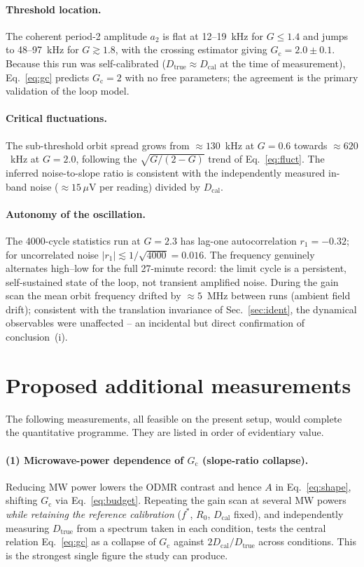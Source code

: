 \documentclass[11pt,a4paper]{article}
\newcommand{\Gc}{G_{\mathrm{c}}}
\newcommand{\Dcal}{D_{\mathrm{cal}}}
\newcommand{\Dtrue}{D_{\mathrm{true}}}
\begin{document}
\paragraph{Threshold location.} The coherent period-2 amplitude $a_2$ is flat
at 12--19~kHz for $G \le 1.4$ and jumps to 48--97~kHz for $G \gtrsim 1.8$,
with the crossing estimator giving $\Gc = 2.0 \pm 0.1$. Because this run was
self-calibrated ($\Dtrue \approx \Dcal$ at the time of measurement),
Eq.~\eqref{eq:gc} predicts $\Gc = 2$ with no free parameters; the agreement is
the primary validation of the loop model.

\paragraph{Critical fluctuations.} The sub-threshold orbit spread grows from
$\approx 130$~kHz at $G=0.6$ towards $\approx 620$~kHz at $G = 2.0$, following
the $\sqrt{G/(2-G)}$ trend of Eq.~\eqref{eq:fluct}. The inferred noise-to-slope
ratio is consistent with the independently measured in-band noise
($\approx 15\,\mu$V per reading) divided by $\Dcal$.

\paragraph{Autonomy of the oscillation.} The 4000-cycle statistics run at
$G = 2.3$ has lag-one autocorrelation $r_1 = -0.32$; for uncorrelated noise
$|r_1| \lesssim 1/\sqrt{4000} = 0.016$. The frequency genuinely alternates
high--low for the full 27-minute record: the limit cycle is a persistent,
self-sustained state of the loop, not transient amplified noise. During the
gain scan the mean orbit frequency drifted by $\approx 5$~MHz between runs
(ambient field drift); consistent with the translation invariance of
Sec.~\ref{sec:ident}, the dynamical observables were unaffected -- an
incidental but direct confirmation of conclusion~(i).

\section{Proposed additional measurements}
\label{sec:proposed}

The following measurements, all feasible on the present setup, would complete
the quantitative programme. They are listed in order of evidentiary value.

\paragraph{(1) Microwave-power dependence of $\Gc$ (slope-ratio collapse).}
Reducing MW power lowers the ODMR contrast and hence $A$ in
Eq.~\eqref{eq:shape}, shifting $\Gc$ via Eq.~\eqref{eq:budget}. Repeating the
gain scan at several MW powers \emph{while retaining the reference
calibration} ($f^{*}$, $R_0$, $\Dcal$ fixed), and independently measuring
$\Dtrue$ from a spectrum taken in each condition, tests the central relation
Eq.~\eqref{eq:gc} as a collapse of $\Gc$ against $2\Dcal/\Dtrue$ across
conditions. This is the strongest single figure the study can produce.
\end{document}

